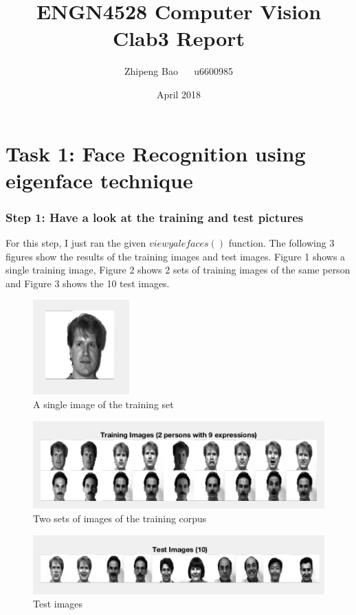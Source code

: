 \documentclass{article}
\title{ENGN4528 Computer Vision Clab3 Report}
\author{Zhipeng Bao ~~ u6600985}
\date{April 2018}
\begin{document}
\maketitle

\section*{Task 1: Face Recognition using eigenface technique}

\subsubsection*{Step 1: Have a look at the training and test pictures}
For this step, I just ran the given $viewyalefaces()$ function. The following 3 figures show the results of the training images and test images. Figure 1 shows a single training image, Figure 2 shows 2 sets of training images of the same person and Figure 3 shows the 10 test images.

\begin{figure}[htbp]
    \centering
    \includegraphics[scale = 0.5]{t10.png}
    \caption{A single image of the training set}
    \label{fig1}
\end{figure}

\begin{figure}[htbp]
    \centering
    \includegraphics[scale = 0.4]{t11.png}
    \caption{Two sets of images of the training corpus}
    \label{fig2}
\end{figure}

\begin{figure}[htbp]
    \centering
    \includegraphics[scale = 0.4]{t12.png}
    \caption{Test images}
    \label{fig3}
\end{figure}
\end{document}
